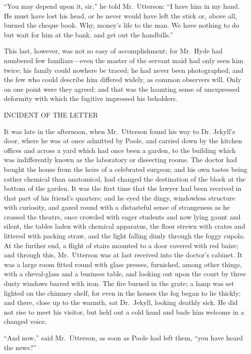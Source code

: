 \documentclass[12pt,openright]{book}
\begin{document}
“You may depend upon it, sir,” he told Mr. Utterson: “I have him in my hand. He must have lost his head, or he never would have left the stick or, above all, burned the cheque book. Why, money’s life to the man. We have nothing to do but wait for him at the bank, and get out the handbills.”

This last, however, was not so easy of accomplishment; for Mr. Hyde had numbered few familiars—even the master of the servant maid had only seen him twice; his family could nowhere be traced; he had never been photographed; and the few who could describe him differed widely, as common observers will. Only on one point were they agreed; and that was the haunting sense of unexpressed deformity with which the fugitive impressed his beholders.

INCIDENT OF THE LETTER

It was late in the afternoon, when Mr. Utterson found his way to Dr. Jekyll’s door, where he was at once admitted by Poole, and carried down by the kitchen offices and across a yard which had once been a garden, to the building which was indifferently known as the laboratory or dissecting rooms. The doctor had bought the house from the heirs of a celebrated surgeon; and his own tastes being rather chemical than anatomical, had changed the destination of the block at the bottom of the garden. It was the first time that the lawyer had been received in that part of his friend’s quarters; and he eyed the dingy, windowless structure with curiosity, and gazed round with a distasteful sense of strangeness as he crossed the theatre, once crowded with eager students and now lying gaunt and silent, the tables laden with chemical apparatus, the floor strewn with crates and littered with packing straw, and the light falling dimly through the foggy cupola. At the further end, a flight of stairs mounted to a door covered with red baize; and through this, Mr. Utterson was at last received into the doctor’s cabinet. It was a large room fitted round with glass presses, furnished, among other things, with a cheval-glass and a business table, and looking out upon the court by three dusty windows barred with iron. The fire burned in the grate; a lamp was set lighted on the chimney shelf, for even in the houses the fog began to lie thickly; and there, close up to the warmth, sat Dr. Jekyll, looking deathly sick. He did not rise to meet his visitor, but held out a cold hand and bade him welcome in a changed voice.

“And now,” said Mr. Utterson, as soon as Poole had left them, “you have heard the news?”
\end{document}
